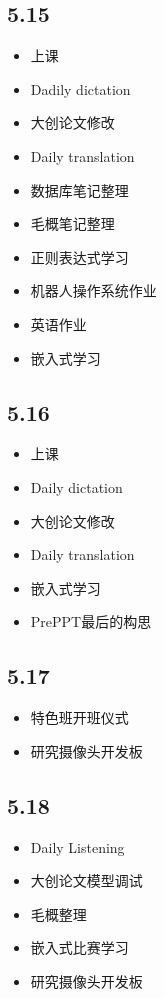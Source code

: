 \documentclass[UTF8]{ctexart}
\begin{document}
\subsection*{5.15}
\begin{itemize}
    \item 上课
    \item Dadily dictation
    \item 大创论文修改
    \item Daily translation
    \item 数据库笔记整理
    \item 毛概笔记整理
    \item 正则表达式学习
    \item 机器人操作系统作业
    \item 英语作业
    \item 嵌入式学习
\end{itemize}
\subsection*{5.16}
\begin{itemize}
    \item 上课
    \item Daily dictation
    \item 大创论文修改
    \item Daily translation
    \item 嵌入式学习
    \item PrePPT最后的构思
\end{itemize}
\subsection*{5.17}
\begin{itemize}
    \item 特色班开班仪式
    \item 研究摄像头开发板
\end{itemize}
\subsection*{5.18}
\begin{itemize}
    \item Daily Listening
    \item 大创论文模型调试
    \item 毛概整理
    \item 嵌入式比赛学习
    \item 研究摄像头开发板
\end{itemize}
\end{document}
